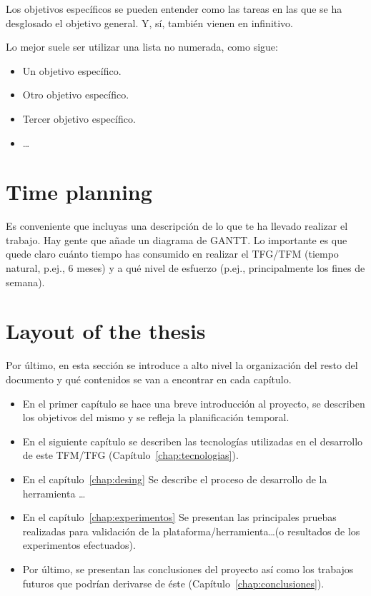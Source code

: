 Los objetivos específicos se pueden entender como las tareas en las que se ha desglosado el objetivo general. Y, sí, también vienen en infinitivo.

Lo mejor suele ser utilizar una lista no numerada, como sigue:

    \begin{itemize}
        \item Un objetivo específico.
        \item Otro objetivo específico.
        \item Tercer objetivo específico.
        \item \ldots
    \end{itemize}

\section{Time planning}
\label{sec:planificacion-temporal}

Es conveniente que incluyas una descripción de lo que te ha llevado realizar el trabajo.
Hay gente que añade un diagrama de GANTT.
Lo importante es que quede claro cuánto tiempo has consumido en realizar el TFG/TFM 
(tiempo natural, p.ej., 6 meses) y a qué nivel de esfuerzo (p.ej., principalmente los 
fines de semana).

\section{Layout of the thesis}
\label{sec:estructura}

Por último, en esta sección se introduce a alto nivel la organización del resto del documento
y qué contenidos se van a encontrar en cada capítulo.

    \begin{itemize}
      \item En el primer capítulo se hace una breve introducción al proyecto, se describen los objetivos del mismo y se refleja la planificación temporal.
      \item En el siguiente capítulo se describen las tecnologías utilizadas en el desarrollo de este TFM/TFG (Capítulo~\ref{chap:tecnologias}).
      \item En el capítulo~\ref{chap:desing} Se describe el proceso de desarrollo
      de la herramienta \ldots
      \item En el capítulo~\ref{chap:experimentos} Se presentan las principales pruebas realizadas
      para validación de la plataforma/herramienta\ldots (o resultados de los experimentos
      efectuados).
      \item Por último, se presentan las conclusiones del proyecto así como los trabajos futuros que podrían derivarse de éste (Capítulo~\ref{chap:conclusiones}).
    \end{itemize}

\cleardoublepage